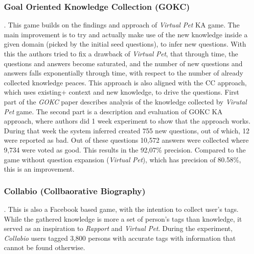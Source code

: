 \subsubsection{Goal Oriented Knowledge Collection (GOKC)}. 
This game builds on the
findings and approach of \emph{Virtual Pet} KA game. The main improvement
is to try and actually make use of the new knowledge inside a given domain
(picked by the initial seed questions), to infer new questions. With this
the authors tried to fix a drawback of \emph{Virtual Pet}, that through
time, the questions and answers become saturated, and the number of new
questions and answers falls exponentially through time, with respect
to the number of already collected knowledge peaces.
This approach is also aligned with the CC approach, which uses existing+
context and new knowledge, to drive the questions. First part of the \emph{GOKC}
paper describes analysis of the knowledge collected by \emph{Virutal Pet} game. 
The second part is a description and evaluation of  GOKC KA approach, where 
authors did 1 week experiment to show that the approach works. During that 
week the system inferred created 755 new questions, out of which, 12 were
reported as bad. Out of these questions 10,572 answers were collected where
9,734 were voted as good. This results in the 92,07\% precision. Compared
to the game without question expansion (\emph{Virtual Pet}), which has
precision of 80.58\%, this is an improvement.

\subsubsection{Collabio (Collbaorative Biography)}. 
This is also a Facebook based game, with the intention to
collect user's tags. While the gathered knowledge is more a set of person's 
tags than knowledge, it served as an inspiration to \emph{Rapport} and 
\emph{Virtual Pet}. During the experiment, \emph{Collabio} users tagged
3,800 persons with accurate tags with information that cannot be found 
otherwise\parencite{Bernstein2009, Bernstein2010}.

